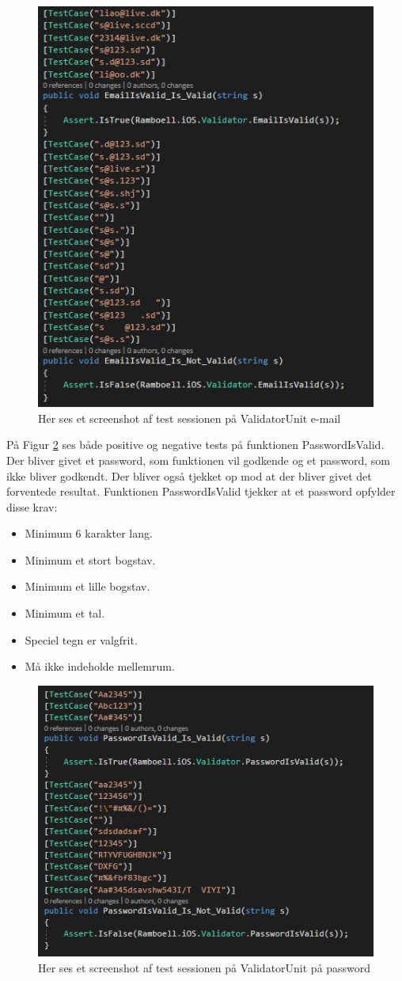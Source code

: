 \begin{figure}[H]
	\centering
	\includegraphics[width=0.6\linewidth]{Unit/ValidatorUnitEmail.PNG}
	\caption{Her ses et screenshot af test sessionen på ValidatorUnit e-mail}
	\label{fig:ValidatorUnitEmail}
\end{figure}

\clearpage

På Figur \ref{fig:ValidatorUnitPassword} ses både positive og negative tests på funktionen PasswordIsValid. Der bliver givet et password, som funktionen vil godkende og et password, som ikke bliver godkendt. Der bliver også tjekket op mod at der bliver givet det forventede resultat. Funktionen PasswordIsValid tjekker at et password opfylder disse krav: 
\begin{itemize}
	\item Minimum 6 karakter lang.
	\item Minimum et stort bogstav.
	\item Minimum et lille bogstav.
	\item Minimum et tal.
	\item Speciel tegn er valgfrit.
	\item Må ikke indeholde mellemrum.
\end{itemize}

\begin{figure}[H]
	\centering
	\includegraphics[width=0.6\linewidth]{Unit/ValidatorUnitPassword.PNG}
	\caption{Her ses et screenshot af test sessionen på ValidatorUnit på password}
	\label{fig:ValidatorUnitPassword}
\end{figure}
